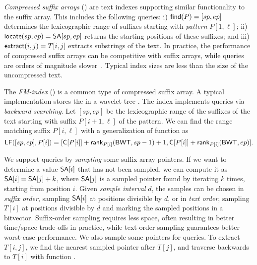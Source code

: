\emph{Compressed suffix arrays} (\CSA) \cite{Sadakane2003,Ferragina2005a,Grossi2005} are
text indexes supporting similar functionality to the suffix array. This
includes the following queries: i) $\mathsf{find}(P) = [sp,ep]$ determines the
lexicographic range of suffixes starting with \emph{pattern} $P[1,\ell]$; ii)
$\mathsf{locate}(sp,ep) = \mathsf{SA}[sp,ep]$ returns the starting positions of these
suffixes; and iii) $\mathsf{extract}(i,j) = T[i,j]$ extracts substrings of the text.
In practice, the \find{} performance of compressed suffix arrays can be
competitive with suffix arrays, while \locate{} queries are orders of
magnitude slower~\cite{Ferragina2009a}. Typical index sizes are less than the
size of the uncompressed text.

The \emph{FM-index} (\FMI) \cite{Ferragina2005a} is a common type of
compressed suffix array. A typical implementation \cite{Ferragina2007a}
stores the \BWT{} in a
wavelet tree \cite{Grossi2003}. The index implements \find{} queries via
\emph{backward searching}. Let $[sp,ep]$ be the lexicographic
range of the suffixes of the text starting with suffix $P[i+1,\ell]$ of the
pattern. We can find the range matching suffix $P[i,\ell]$ with a
generalization of function \LF{} as
$$
\mathsf{LF}([sp,ep],P[i]) =
[\mathsf{C}[P[i]] + \mathsf{rank}_{P[i]}(\mathsf{BWT}, sp-1) + 1,
\mathsf{C}[P[i]] + \mathsf{rank}_{P[i]}(\mathsf{BWT}, ep)].
$$

We support \locate{} queries by \emph{sampling} some suffix array pointers. If
we want to determine a value $\mathsf{SA}[i]$ that has not been sampled, we can
compute it as $\mathsf{SA}[i] = \mathsf{SA}[j]+k$, where $\mathsf{SA}[j]$ is a sampled pointer
found by iterating \LF{} $k$ times, starting from position $i$. Given
\emph{sample interval} $d$, the samples can be chosen in \emph{suffix order},
sampling $\mathsf{SA}[i]$ at positions divisible by $d$, or in \emph{text order},
sampling $T[i]$ at positions divisible by $d$ and marking the sampled \SA{}
positions in a bitvector. Suffix-order sampling requires less space, often
resulting in better time/space trade-offs in practice, while text-order
sampling guarantees better worst-case performance. We also sample some \ISA{}
pointers for \extract{} queries. To extract $T[i,j]$, we find the nearest
sampled pointer after $T[j]$, and traverse backwards to $T[i]$ with
function \LF.

